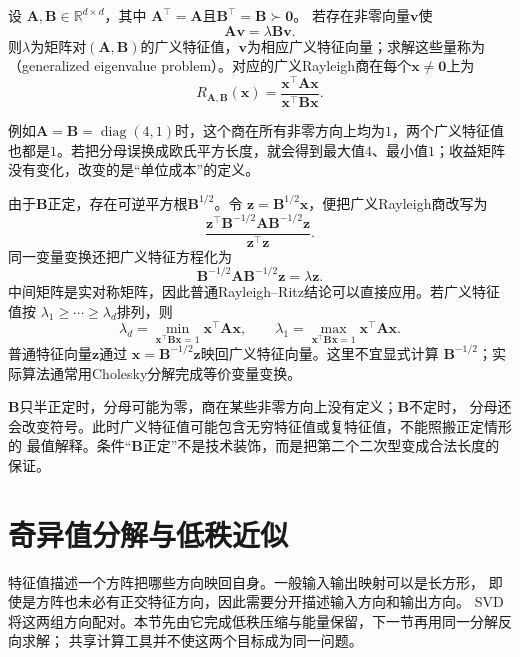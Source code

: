 \begin{definition}[对称正定矩阵对的广义特征值]
\label{def:matrix-analysis-generalized-eigenvalue}
设
$\bm{A},\bm{B}\in\mathbb{R}^{d\times d}$，其中
$\bm{A}^{\top}=\bm{A}$且$\bm{B}^{\top}=\bm{B}\succ\bm{0}$。
若存在非零向量$\bm v$使
\begin{equation}
  \bm{A}\bm{v}=\lambda\bm{B}\bm{v}.
  \label{eq:matrix-analysis-generalized-eigenproblem}
\end{equation}
则$\lambda$为矩阵对$(\bm A,\bm B)$的广义特征值，$\bm v$为相应广义特征向量；求解这些量称为（generalized eigenvalue problem）。对应的广义Rayleigh商在每个$\bm x\neq\bm0$上为
\[
  R_{\bm{A},\bm{B}}(\bm{x})
  =\frac{\bm{x}^{\top}\bm{A}\bm{x}}{\bm{x}^{\top}\bm{B}\bm{x}}.
\]
\end{definition}

例如$\bm A=\bm B=\operatorname{diag}(4,1)$时，这个商在所有非零方向上均为$1$，两个广义特征值也都是$1$。若把分母误换成欧氏平方长度，就会得到最大值$4$、最小值$1$；收益矩阵没有变化，改变的是“单位成本”的定义。

由于$\bm{B}$正定，存在可逆平方根$\bm{B}^{1/2}$。令
$\bm{z}=\bm{B}^{1/2}\bm{x}$，便把广义Rayleigh商改写为
\[
  \frac{\bm{z}^{\top}
    \bm{B}^{-1/2}\bm{A}\bm{B}^{-1/2}\bm{z}}
       {\bm{z}^{\top}\bm{z}}.
\]
同一变量变换还把广义特征方程化为
\[
  \bm{B}^{-1/2}\bm{A}\bm{B}^{-1/2}\bm{z}
  =\lambda\bm{z}.
\]
中间矩阵是实对称矩阵，因此普通Rayleigh--Ritz结论可以直接应用。若广义特征值按
$\lambda_1\geq\cdots\geq\lambda_d$排列，则
\[
  \lambda_d
  =\min_{\bm{x}^{\top}\bm{B}\bm{x}=1}
    \bm{x}^{\top}\bm{A}\bm{x},
  \qquad
  \lambda_1
  =\max_{\bm{x}^{\top}\bm{B}\bm{x}=1}
    \bm{x}^{\top}\bm{A}\bm{x}.
\]
普通特征向量$\bm{z}$通过
$\bm{x}=\bm{B}^{-1/2}\bm{z}$映回广义特征向量。这里不宜显式计算
$\bm{B}^{-1/2}$；实际算法通常用Cholesky分解完成等价变量变换。

$\bm{B}$只半正定时，分母可能为零，商在某些非零方向上没有定义；$\bm{B}$不定时，
分母还会改变符号。此时广义特征值可能包含无穷特征值或复特征值，不能照搬正定情形的
最值解释。条件“$\bm{B}$正定”不是技术装饰，而是把第二个二次型变成合法长度的保证。

\section{奇异值分解与低秩近似}
\label{sec:matrix-analysis-svd-low-rank}

特征值描述一个方阵把哪些方向映回自身。一般输入输出映射可以是长方形，
即使是方阵也未必有正交特征方向，因此需要分开描述输入方向和输出方向。
SVD将这两组方向配对。本节先由它完成低秩压缩与能量保留，下一节再用同一分解反向求解；
共享计算工具并不使这两个目标成为同一问题。

